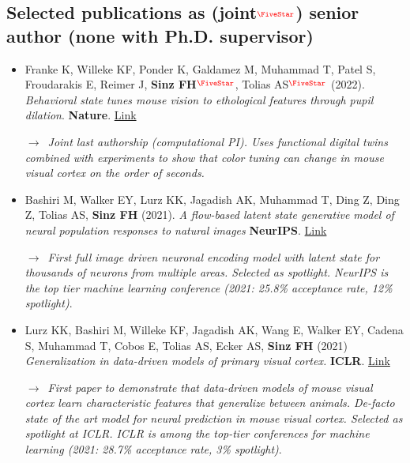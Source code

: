 \documentclass[COG,11pt]{ercgrant}
\begin{document}
\subsection{Selected publications as (joint$^{\color{red}\fstar}$) senior author (none with Ph.D. supervisor)}
\begin{itemize}[topsep=0pt,itemsep=0.62ex,partopsep=0ex,parsep=0.5ex]
    \item Franke K, Willeke KF, Ponder K, Galdamez M, Muhammad T, Patel S, Froudarakis E, Reimer J, \textbf{Sinz FH}$^{\color{red}\fstar}$, Tolias AS$^{\color{red}\fstar}$ (2022). \textit{Behavioral state tunes mouse vision to ethological features through pupil dilation}. \textbf{Nature}. \href{https://www.nature.com/articles/s41586-022-05270-3}{Link}
    
    $\rightarrow$~\textit{Joint last authorship (computational PI). Uses functional digital twins combined with experiments to show that color tuning can change in mouse visual cortex on the order of seconds. }
    
    \item Bashiri M, Walker EY, Lurz KK, Jagadish AK, Muhammad T, Ding Z, Ding Z, Tolias AS, \textbf{Sinz FH} (2021). \textit{A flow-based latent state generative model of neural population responses to natural images} \textbf{NeurIPS}. \href{https://openreview.net/forum?id=1yeYYtLqq7K}{Link}
    
    $\rightarrow$~\textit{First full image driven neuronal encoding model with latent state for thousands of neurons from multiple areas. Selected as spotlight. NeurIPS is the top tier machine learning conference (2021: 25.8\% acceptance rate, 12\% spotlight)}.
    
    \item Lurz KK, Bashiri M, Willeke KF, Jagadish AK, Wang E, Walker EY, Cadena S, Muhammad T, Cobos E, Tolias AS, Ecker AS, \textbf{Sinz FH} (2021) \textit{Generalization in data-driven models of primary visual cortex.} \textbf{ICLR}. \href{https://openreview.net/forum?id=Tp7kI90Htd}{Link}
    
    $\rightarrow$~\textit{First paper to demonstrate that data-driven models of mouse visual cortex learn characteristic features that generalize between animals. De-facto state of the art model for neural prediction in mouse visual cortex. Selected as spotlight at ICLR. ICLR is among the top-tier conferences for machine learning (2021: 28.7\% acceptance rate, 3\% spotlight)}.
\end{itemize}
\end{document}
